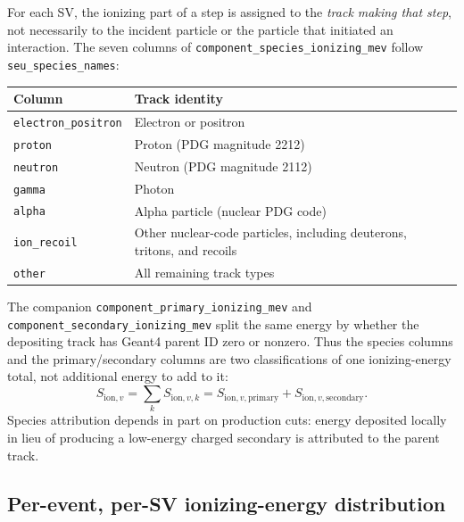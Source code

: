 \documentclass[11pt]{article}
\begin{document}
For each SV, the ionizing part of a step is assigned to the \emph{track making
that step}, not necessarily to the incident particle or the particle that
initiated an interaction. The seven columns of
\texttt{component\_species\_ionizing\_mev} follow
\texttt{seu\_species\_names}:
\begin{center}
\begin{tabular}{ll}
\toprule
Column & Track identity \\
\midrule
\texttt{electron\_positron} & Electron or positron \\
\texttt{proton} & Proton (PDG magnitude 2212) \\
\texttt{neutron} & Neutron (PDG magnitude 2112) \\
\texttt{gamma} & Photon \\
\texttt{alpha} & Alpha particle (nuclear PDG code) \\
\texttt{ion\_recoil} & Other nuclear-code particles, including deuterons, tritons, and recoils \\
\texttt{other} & All remaining track types \\
\bottomrule
\end{tabular}
\end{center}
The companion \texttt{component\_primary\_ionizing\_mev} and
\texttt{component\_secondary\_ionizing\_mev} split the same energy by
whether the depositing track has Geant4 parent ID zero or nonzero. Thus the
species columns and the primary/secondary columns are two classifications
of one ionizing-energy total, not additional energy to add to it:
\begin{equation}
 S_{\mathrm{ion},v}=\sum_k S_{\mathrm{ion},v,k}
 =S_{\mathrm{ion},v,\mathrm{primary}}
 +S_{\mathrm{ion},v,\mathrm{secondary}}.
\end{equation}
Species attribution depends in part on production cuts: energy deposited
locally in lieu of producing a low-energy charged secondary is attributed to
the parent track.

\subsection{Per-event, per-SV ionizing-energy distribution}
\end{document}
